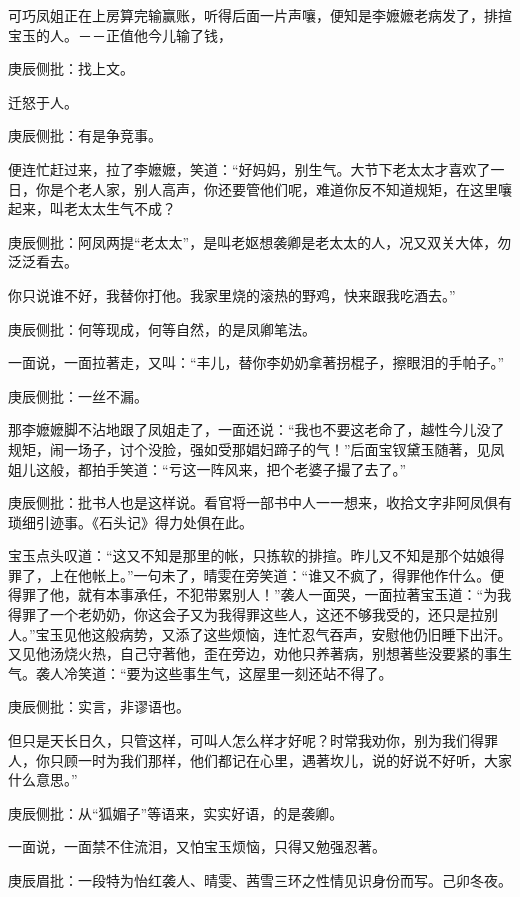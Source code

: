 \begin{parag}


    可巧凤姐正在上房算完输赢账，听得后面一片声嚷，便知是李嬷嬷老病发了，排揎宝玉的人。－－正值他今儿输了钱，\begin{note}庚辰侧批：找上文。\end{note}迁怒于人。\begin{note}庚辰侧批：有是争竞事。\end{note}便连忙赶过来，拉了李嬷嬷，笑道：“好妈妈，别生气。大节下老太太才喜欢了一日，你是个老人家，别人高声，你还要管他们呢，难道你反不知道规矩，在这里嚷起来，叫老太太生气不成？\begin{note}庚辰侧批：阿凤两提“老太太”，是叫老妪想袭卿是老太太的人，况又双关大体，勿泛泛看去。\end{note}你只说谁不好，我替你打他。我家里烧的滚热的野鸡，快来跟我吃酒去。”\begin{note}庚辰侧批：何等现成，何等自然，的是凤卿笔法。\end{note}一面说，一面拉著走，又叫：“丰儿，替你李奶奶拿著拐棍子，擦眼泪的手帕子。”\begin{note}庚辰侧批：一丝不漏。\end{note}那李嬷嬷脚不沾地跟了凤姐走了，一面还说：“我也不要这老命了，越性今儿没了规矩，闹一场子，讨个没脸，强如受那娼妇蹄子的气！”后面宝钗黛玉随著，见凤姐儿这般，都拍手笑道：“亏这一阵风来，把个老婆子撮了去了。”\begin{note}庚辰侧批：批书人也是这样说。看官将一部书中人一一想来，收拾文字非阿凤俱有琐细引迹事。《石头记》得力处俱在此。\end{note}
\end{parag}


\begin{parag}


    宝玉点头叹道：“这又不知是那里的帐，只拣软的排揎。昨儿又不知是那个姑娘得罪了，上在他帐上。”一句未了，晴雯在旁笑道：“谁又不疯了，得罪他作什么。便得罪了他，就有本事承任，不犯带累别人！”袭人一面哭，一面拉著宝玉道：“为我得罪了一个老奶奶，你这会子又为我得罪这些人，这还不够我受的，还只是拉别人。”宝玉见他这般病势，又添了这些烦恼，连忙忍气吞声，安慰他仍旧睡下出汗。又见他汤烧火热，自己守著他，歪在旁边，劝他只养著病，别想著些没要紧的事生气。袭人冷笑道：“要为这些事生气，这屋里一刻还站不得了。\begin{note}庚辰侧批：实言，非谬语也。\end{note}但只是天长日久，只管这样，可叫人怎么样才好呢？时常我劝你，别为我们得罪人，你只顾一时为我们那样，他们都记在心里，遇著坎儿，说的好说不好听，大家什么意思。”\begin{note}庚辰侧批：从“狐媚子”等语来，实实好语，的是袭卿。\end{note}一面说，一面禁不住流泪，又怕宝玉烦恼，只得又勉强忍著。\begin{note}庚辰眉批：一段特为怡红袭人、晴雯、茜雪三环之性情见识身份而写。己卯冬夜。\end{note}
\end{parag}


